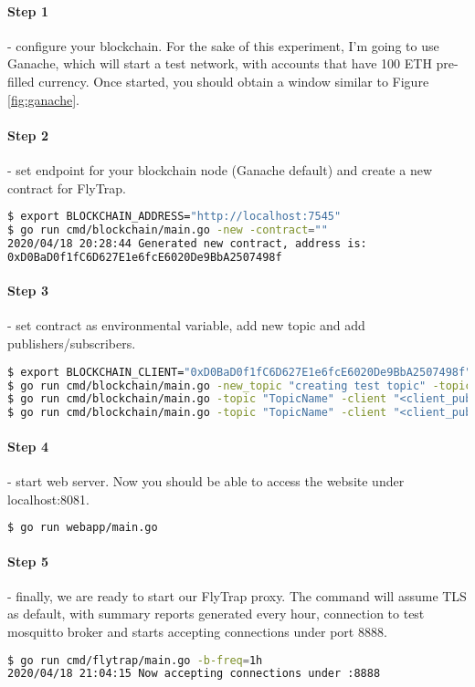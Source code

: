 \paragraph{Step 1} - configure your blockchain. For the sake of this experiment, I'm going to use Ganache, which will start a test network, with accounts that have 100 ETH pre-filled currency. Once started, you should obtain a window similar to Figure \ref{fig:ganache}.
\paragraph{Step 2} - set endpoint for your blockchain node (Ganache default) and create a new contract for FlyTrap.
\begin{lstlisting}[language=bash]
$ export BLOCKCHAIN_ADDRESS="http://localhost:7545"
$ go run cmd/blockchain/main.go -new -contract=""
2020/04/18 20:28:44 Generated new contract, address is:
0xD0BaD0f1fC6D627E1e6fcE6020De9BbA2507498f
\end{lstlisting}
\paragraph{Step 3} - set contract as environmental variable, add new topic and add publishers/subscribers.
\begin{lstlisting}[language=bash,breaklines=true]
$ export BLOCKCHAIN_CLIENT="0xD0BaD0f1fC6D627E1e6fcE6020De9BbA2507498f"
$ go run cmd/blockchain/main.go -new_topic "creating test topic" -topic "TopicName"
$ go run cmd/blockchain/main.go -topic "TopicName" -client "<client_pubkey>" -pub "adding test publisher"
$ go run cmd/blockchain/main.go -topic "TopicName" -client "<client_pubkey>" -sub "adding test subscriber"
\end{lstlisting}
\paragraph{Step 4} - start web server. Now you should be able to access the website under localhost:8081.
\begin{lstlisting}[language=bash,breaklines=true]
$ go run webapp/main.go
\end{lstlisting}
\paragraph{Step 5} - finally, we are ready to start our FlyTrap proxy. The command will assume TLS as default, with summary reports generated every hour, connection to test mosquitto broker and starts accepting connections under port 8888.
\begin{lstlisting}[language=bash,breaklines=true]
$ go run cmd/flytrap/main.go -b-freq=1h
2020/04/18 21:04:15 Now accepting connections under :8888
\end{lstlisting}
